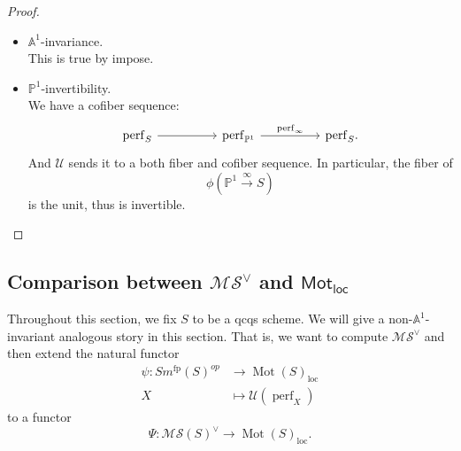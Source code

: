 \documentclass{article}
\theoremstyle{definition}
\newcommand{\on}{\operatorname}
\begin{document}
\begin{proof}
\begin{itemize}
\[\begin{tikzcd}
	{\on{perf}_{X,X-U}} && {\on{perf}_X} && {\on{perf}_U} \\
	\\
	{\on{perf}_{V,V-W}} && {\on{perf}_V} && {\on{perf}_W}
	\arrow[from=1-1, to=1-3]
	\arrow["\simeq"', from=1-1, to=3-1]
	\arrow[from=1-3, to=1-5]
	\arrow[from=1-3, to=3-3]
	\arrow[from=1-5, to=3-5]
	\arrow[from=3-1, to=3-3]
	\arrow[from=3-3, to=3-5].
\end{tikzcd}\]
Since $\mathcal{U}$ is the universal localizing invariant, applying $\mathcal{U}$ gives a commutative diagram in which, again, the horizontal sequences are fibers and the left most arrow is an equivalence. As a consequence,
\[\begin{tikzcd}
	{\mathcal{U}(\on{perf}_X)} && {\mathcal{U}(\on{perf}_U)} \\
	\\
	{\mathcal{U}(\on{perf}_V)} && {\mathcal{U}(\on{perf}_W)}
	\arrow[from=1-1, to=1-3]
	\arrow[from=1-1, to=3-1]
	\arrow[from=1-3, to=3-3]
	\arrow[from=3-1, to=3-3]
\end{tikzcd}\]
is a pullback as desired.
\item $\mathbb{A}^1$-invariance.\\
This is true by impose.
\item $\mathbb{P}^1$-invertibility.\\
We have a cofiber sequence:
\[\begin{tikzcd}
	{\on{perf}_S} && {\on{perf}_{\mathbb{P}^1}} && {\on{perf}_S}
	\arrow[from=1-1, to=1-3]
	\arrow["\on{perf}_\infty", from=1-3, to=1-5].
\end{tikzcd}\]
And $\mathcal{U}$ sends it to a both fiber and cofiber sequence. In particular, the fiber of \[\phi(\mathbb{P}^1\xrightarrow{\infty} S)\] is the unit, thus is invertible.
\end{itemize}
\end{proof}







\subsection{Comparison between $\mathcal{MS}^\vee$ and $\mathsf{Mot}_\mathsf{loc}$}
Throughout this section, we fix $S$ to be a qcqs scheme. We will give a non-$\mathbb{A}^1$-invariant analogous story in this section. That is, we want to compute $\mathcal{MS}^\vee$ and then extend the natural functor 
\[\begin{aligned}
\psi: Sm^{\on{fp}}(S)^{op} &\rightarrow \on{Mot}(S)_{\on{loc}}\\
X&\mapsto \mathcal{U}(\on{perf}_X)
\end{aligned}\]
to a functor\[\Psi:\mathcal{MS}(S)^{\vee}\rightarrow\on{Mot}(S)_{\on{loc}}.\]
\end{document}
